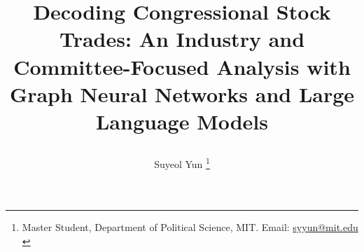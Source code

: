 \documentclass[15pt,letterpaper]{article}
\newcommand{\tit}{
\Large \bf
Decoding Congressional Stock Trades: An Industry and Committee-Focused Analysis with Graph Neural Networks and Large Language Models
}
\newcommand\spacingset[1]{\renewcommand{\baselinestretch}
{#1}\small\normalsize}
\begin{document}
\spacingset{1.25}

\setcounter{page}{0}
\vspace{-.1in}

{\title{
    \tit
  }
  \author{
    Suyeol Yun
  \thanks{Master Student, Department of Political Science, MIT. Email: \href{mailto:syyun@mit.edu}{syyun@mit.edu}\\
  }
  }
  \maketitle
}

\thispagestyle{empty}
\vspace{-.1in}
\end{document}
